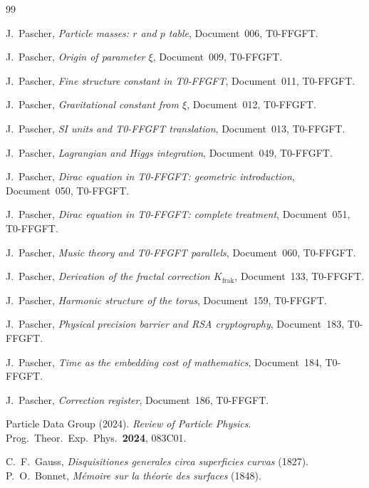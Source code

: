 \begin{thebibliography}{99}

J.~Pascher,
\textit{Particle masses: $r$ and $p$ table},
Document~006, T0-FFGFT.

J.~Pascher,
\textit{Origin of parameter $\xi$},
Document~009, T0-FFGFT.

J.~Pascher,
\textit{Fine structure constant in T0-FFGFT},
Document~011, T0-FFGFT.

J.~Pascher,
\textit{Gravitational constant from $\xi$},
Document~012, T0-FFGFT.

J.~Pascher,
\textit{SI units and T0-FFGFT translation},
Document~013, T0-FFGFT.

J.~Pascher,
\textit{Lagrangian and Higgs integration},
Document~049, T0-FFGFT.

J.~Pascher,
\textit{Dirac equation in T0-FFGFT: geometric introduction},
Document~050, T0-FFGFT.

J.~Pascher,
\textit{Dirac equation in T0-FFGFT: complete treatment},
Document~051, T0-FFGFT.

J.~Pascher,
\textit{Music theory and T0-FFGFT parallels},
Document~060, T0-FFGFT.

J.~Pascher,
\textit{Derivation of the fractal correction $K_{\text{frak}}$},
Document~133, T0-FFGFT.

J.~Pascher,
\textit{Harmonic structure of the torus},
Document~159, T0-FFGFT.

J.~Pascher,
\textit{Physical precision barrier and RSA cryptography},
Document~183, T0-FFGFT.

J.~Pascher,
\textit{Time as the embedding cost of mathematics},
Document~184, T0-FFGFT.

J.~Pascher,
\textit{Correction register},
Document~186, T0-FFGFT.

Particle Data Group (2024).
\textit{Review of Particle Physics}.
Prog.\ Theor.\ Exp.\ Phys.\ \textbf{2024}, 083C01.

C.~F.~Gauss,
\textit{Disquisitiones generales circa superficies curvas} (1827).
P.~O.~Bonnet,
\textit{Mémoire sur la théorie des surfaces} (1848).

\end{thebibliography}
